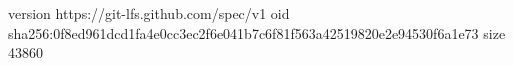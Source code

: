 version https://git-lfs.github.com/spec/v1
oid sha256:0f8ed961dcd1fa4e0cc3ec2f6e041b7c6f81f563a42519820e2e94530f6a1e73
size 43860
